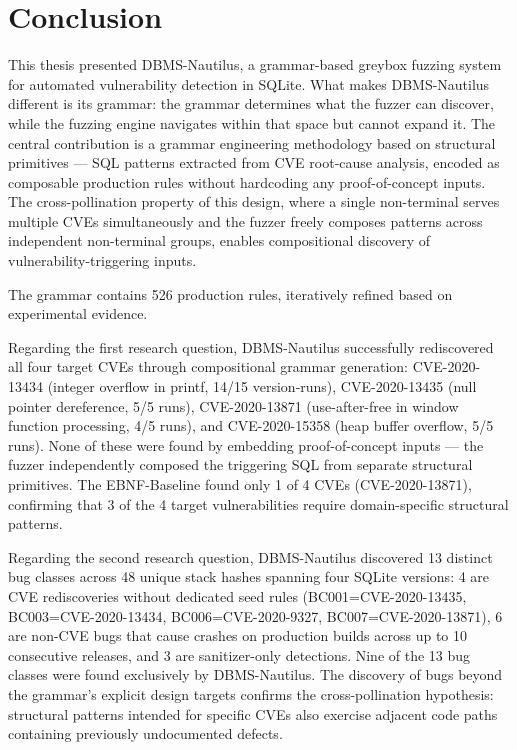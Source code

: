 \chapter*{Conclusion}

This thesis presented DBMS-Nautilus, a grammar-based greybox fuzzing system for automated vulnerability detection in SQLite. What makes DBMS-Nautilus different is its grammar: the grammar determines what the fuzzer can discover, while the fuzzing engine navigates within that space but cannot expand it. The central contribution is a grammar engineering methodology based on structural primitives --- SQL patterns extracted from CVE root-cause analysis, encoded as composable production rules without hardcoding any proof-of-concept inputs. The cross-pollination property of this design, where a single non-terminal serves multiple CVEs simultaneously and the fuzzer freely composes patterns across independent non-terminal groups, enables compositional discovery of vulnerability-triggering inputs.

The grammar contains 526 production rules, iteratively refined based on experimental evidence.

Regarding the first research question, DBMS-Nautilus successfully rediscovered all four target CVEs through compositional grammar generation: CVE-2020-13434 (integer overflow in printf, 14/15 version-runs), CVE-2020-13435 (null pointer dereference, 5/5 runs), CVE-2020-13871 (use-after-free in window function processing, 4/5 runs), and CVE-2020-15358 (heap buffer overflow, 5/5 runs). None of these were found by embedding proof-of-concept inputs --- the fuzzer independently composed the triggering SQL from separate structural primitives. The EBNF-Baseline found only 1 of 4 CVEs (CVE-2020-13871), confirming that 3 of the 4 target vulnerabilities require domain-specific structural patterns.

Regarding the second research question, DBMS-Nautilus discovered 13 distinct bug classes across 48 unique stack hashes spanning four SQLite versions: 4 are CVE rediscoveries without dedicated seed rules (BC001=CVE-2020-13435, BC003=CVE-2020-13434, BC006=CVE-2020-9327, BC007=CVE-2020-13871), 6 are non-CVE bugs that cause crashes on production builds across up to 10 consecutive releases, and 3 are sanitizer-only detections. Nine of the 13 bug classes were found exclusively by DBMS-Nautilus. The discovery of bugs beyond the grammar's explicit design targets confirms the cross-pollination hypothesis: structural patterns intended for specific CVEs also exercise adjacent code paths containing previously undocumented defects.

